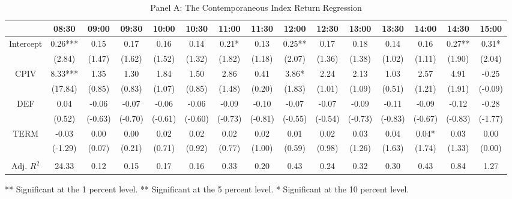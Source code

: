 \begin{table}[h]
\begin{threeparttable}
\begin{subtable}[t]{\linewidth}
\caption{Panel A: The Contemporaneous Index Return Regression }
\footnotesize
\begin{tabular}{ccccccccccccccc}
\toprule
	& 08:30   & 09:00   & 09:30   & 10:00   & 10:30   & 11:00   & 11:30   & 12:00   & 12:30   & 13:00   & 13:30   & 14:00   & 14:30   & 15:00   \\ \midrule
Intercept & 0.26*** & 0.15    & 0.17    & 0.16    & 0.14    & 0.21*   & 0.13    & 0.25**  & 0.17    & 0.18    & 0.14    & 0.16    & 0.27**  & 0.31*   \\
      & (2.84)  & (1.47)  & (1.62)  & (1.52)  & (1.32)  & (1.82)  & (1.18)  & (2.07)  & (1.36)  & (1.38)  & (1.02)  & (1.11)  & (1.90)  & (2.04)  \\
CPIV      & 8.33*** & 1.35    & 1.30    & 1.84    & 1.50    & 2.86    & 0.41    & 3.86*   & 2.24    & 2.13    & 1.03    & 2.57    & 4.91    & -0.25   \\
      & (17.84) & (0.85)  & (0.83)  & (1.07)  & (0.85)  & (1.48)  & (0.20)  & (1.83)  & (1.01)  & (1.09)  & (0.51)  & (1.21)  & (1.91)  & (-0.09) \\
DEF       & 0.04    & -0.06   & -0.07   & -0.06   & -0.06   & -0.09   & -0.10   & -0.07   & -0.07   & -0.09   & -0.11   & -0.09   & -0.12   & -0.28   \\
      & (0.52)  & (-0.63) & (-0.70) & (-0.61) & (-0.60) & (-0.73) & (-0.81) & (-0.55) & (-0.54) & (-0.73) & (-0.83) & (-0.67) & (-0.83) & (-1.77) \\
TERM      & -0.03   & 0.00    & 0.00    & 0.02    & 0.02    & 0.02    & 0.02    & 0.01    & 0.02    & 0.03    & 0.04    & 0.04*   & 0.03    & 0.00    \\
      & (-1.29) & (0.07)  & (0.21)  & (0.71)  & (0.92)  & (0.77)  & (1.00)  & (0.59)  & (0.98)  & (1.26)  & (1.63)  & (1.74)  & (1.33)  & (0.00)  \\
      &         &         &         &         &         &         &         &         &         &         &         &         &         &         \\
Adj. $R^{2}$    & 24.33   & 0.12    & 0.15    & 0.17    & 0.16    & 0.33    & 0.20    & 0.43    & 0.24    & 0.32    & 0.30    & 0.43    & 0.84    & 1.27  \\
\bottomrule
\end{tabular}

\begin{tablenotes}
\item *** Significant at the 1 percent level.    
** Significant at the 5 percent level.   
* Significant at the 10 percent level.
\end{tablenotes}


\end{subtable}
\end{threeparttable}
\end{table}
